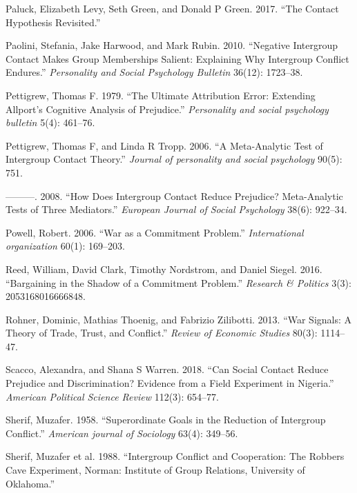 \documentclass[11pt]{article}
\begin{document}
\hypertarget{ref-paluck2017contact}{}
Paluck, Elizabeth Levy, Seth Green, and Donald P Green. 2017. ``The
Contact Hypothesis Revisited.''

\hypertarget{ref-paolini2010negative}{}
Paolini, Stefania, Jake Harwood, and Mark Rubin. 2010. ``Negative
Intergroup Contact Makes Group Memberships Salient: Explaining Why
Intergroup Conflict Endures.'' \emph{Personality and Social Psychology
Bulletin} 36(12): 1723--38.

\hypertarget{ref-pettigrew1979ultimate}{}
Pettigrew, Thomas F. 1979. ``The Ultimate Attribution Error: Extending
Allport's Cognitive Analysis of Prejudice.'' \emph{Personality and
social psychology bulletin} 5(4): 461--76.

\hypertarget{ref-pettigrew2006meta}{}
Pettigrew, Thomas F, and Linda R Tropp. 2006. ``A Meta-Analytic Test of
Intergroup Contact Theory.'' \emph{Journal of personality and social
psychology} 90(5): 751.

\hypertarget{ref-pettigrew2008does}{}
---------. 2008. ``How Does Intergroup Contact Reduce Prejudice?
Meta-Analytic Tests of Three Mediators.'' \emph{European Journal of
Social Psychology} 38(6): 922--34.

\hypertarget{ref-powell2006war}{}
Powell, Robert. 2006. ``War as a Commitment Problem.''
\emph{International organization} 60(1): 169--203.

\hypertarget{ref-reed2016bargaining}{}
Reed, William, David Clark, Timothy Nordstrom, and Daniel Siegel. 2016.
``Bargaining in the Shadow of a Commitment Problem.'' \emph{Research \&
Politics} 3(3): 2053168016666848.

\hypertarget{ref-rohner2013war}{}
Rohner, Dominic, Mathias Thoenig, and Fabrizio Zilibotti. 2013. ``War
Signals: A Theory of Trade, Trust, and Conflict.'' \emph{Review of
Economic Studies} 80(3): 1114--47.

\hypertarget{ref-scacco2018nigeria}{}
Scacco, Alexandra, and Shana S Warren. 2018. ``Can Social Contact Reduce
Prejudice and Discrimination? Evidence from a Field Experiment in
Nigeria.'' \emph{American Political Science Review} 112(3): 654--77.

\hypertarget{ref-sherif1958superordinate}{}
Sherif, Muzafer. 1958. ``Superordinate Goals in the Reduction of
Intergroup Conflict.'' \emph{American journal of Sociology} 63(4):
349--56.

\hypertarget{ref-Sherif1988robbersCave}{}
Sherif, Muzafer et al. 1988. ``Intergroup Conflict and Cooperation: The
Robbers Cave Experiment, Norman: Institute of Group Relations,
University of Oklahoma.''
\end{document}
